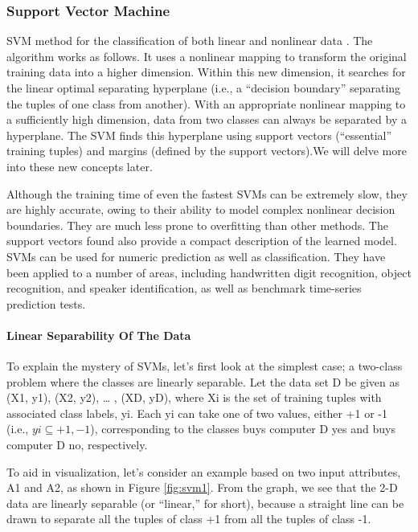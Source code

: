 \documentclass[12pt,fleqn]{book} %
\begin{document}
\subsubsection{Support Vector Machine}
SVM method for the classification of both linear and nonlinear data \cite{classifications}. The algorithm works as follows. It uses a nonlinear mapping to transform the original training data into a higher dimension. Within this new dimension, it searches for the linear optimal separating hyperplane (i.e., a “decision boundary” separating the tuples of one class from another). With an appropriate nonlinear mapping to a sufficiently high dimension, data from two classes can always be separated by a hyperplane. The SVM finds this hyperplane using support vectors (“essential” training tuples) and margins (defined by the support vectors).We will delve more into these new concepts later.


Although the training time of even the fastest SVMs can be extremely slow, they are highly accurate, owing to their ability to model complex nonlinear decision boundaries. They are much less prone to overfitting than other methods. The support vectors found also provide a compact description of the learned model. SVMs can be used for numeric prediction as well as classification. They have been applied to a number of areas, including handwritten digit recognition, object recognition, and speaker identification, as well as benchmark time-series prediction tests.
 \bigskip
\paragraph{Linear Separability Of The Data}
To explain the mystery of SVMs, let’s first look at the simplest case; a two-class problem where the classes are linearly separable. Let the data set D be given as (X1, y1),
(X2, y2), … , (XD, yD), where Xi is the set of training tuples with associated class labels, yi. Each yi can take one of two values, either +1 or -1 (i.e., $yi \subseteq{+1,-1}$), corresponding to the classes buys computer D yes and buys computer D no, respectively.\bigskip

To aid in visualization, let’s consider an example based on two input attributes, A1 and A2, as shown in Figure \ref{fig:svm1}. From the graph, we see that the 2-D data are linearly separable (or “linear,” for short), because a straight line can be drawn to separate all the tuples of class +1 from all the tuples of class -1.\bigskip
\end{document}
